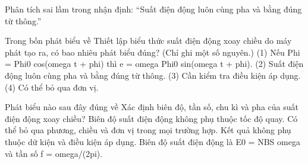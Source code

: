 \begin{bt}
Phân tích sai lầm trong nhận định: “Suất điện động luôn cùng pha và bằng đúng từ thông.”
\end{bt}

\begin{ex}
Trong bốn phát biểu về Thiết lập biểu thức suất điện động xoay chiều do máy phát tạo ra, có bao nhiêu phát biểu đúng? (Chỉ ghi một số nguyên.) (1) Nếu Phi = Phi0 cos(omega t + phi) thì e = omega Phi0 sin(omega t + phi). (2) Suất điện động luôn cùng pha và bằng đúng từ thông. (3) Cần kiểm tra điều kiện áp dụng. (4) Có thể bỏ qua đơn vị.
\end{ex}

\begin{ex}
Phát biểu nào sau đây đúng về Xác định biên độ, tần số, chu kì và pha của suất điện động xoay chiều?
\choice
{Biên độ suất điện động không phụ thuộc tốc độ quay.}
{Có thể bỏ qua phương, chiều và đơn vị trong mọi trường hợp.}
{Kết quả không phụ thuộc dữ kiện và điều kiện áp dụng.}
{\True Biên độ suất điện động là E0 = NBS omega và tần số f = omega/(2pi).}
\end{ex}

